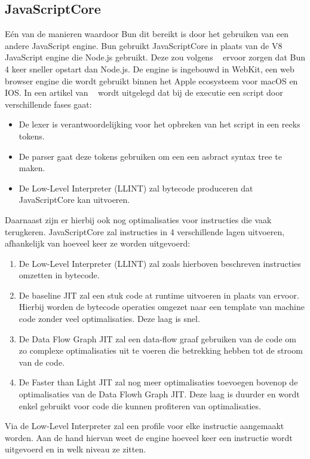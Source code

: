 \subsection{JavaScriptCore}
Eén van de manieren waardoor Bun dit bereikt is door het gebruiken van een andere JavaScript engine.
Bun gebruikt JavaScriptCore in plaats van de V8 JavaScript engine die Node.js gebruikt. 
Deze zou volgens ~\textcite{McDonnel2023} ervoor zorgen dat Bun 4 keer sneller opstart dan Node.js. 
De engine is ingebouwd in WebKit, een web browser engine die wordt gebruikt binnen het Apple ecosysteem voor macOS en IOS.
In een artikel van ~\textcite{Pizlo2020} wordt uitgelegd dat bij de executie een script door verschillende fases gaat:
\begin{itemize}
    \item De lexer is verantwoordelijking voor het opbreken van het script in een reeks tokens.
    \item De parser gaat deze tokens gebruiken om een een asbract syntax tree te maken.
    \item De Low-Level Interpreter (LLINT) zal bytecode produceren dat JavaScriptCore kan uitvoeren.
\end{itemize}
Daarnaast zijn er hierbij ook nog optimalisaties voor instructies die vaak terugkeren. 
JavaScriptCore zal instructies in 4 verschillende lagen uitvoeren, afhankelijk van hoeveel keer ze worden uitgevoerd:
\begin{enumerate}
    \item De Low-Level Interpreter (LLINT) zal zoals hierboven beschreven instructies omzetten in bytecode.
    \item De baseline JIT zal een stuk code at runtime uitvoeren in plaats van ervoor. 
    Hierbij worden de bytecode operaties omgezet naar een template van machine code zonder veel optimalisaties. Deze laag is snel.
    \item De Data Flow Graph JIT zal een data-flow graaf gebruiken van de code om zo complexe optimalisaties uit te voeren die betrekking hebben tot de stroom van de code.
    \item De Faster than Light JIT zal nog meer optimalisaties toevoegen bovenop de optimalisaties van de Data Flowh Graph JIT. 
    Deze laag is duurder en wordt enkel gebruikt voor code die kunnen profiteren van optimalisaties.
\end{enumerate}
Via de Low-Level Interpreter zal een profile voor elke instructie aangemaakt worden. 
Aan de hand hiervan weet de engine hoeveel keer een instructie wordt uitgevoerd en in welk niveau ze zitten.
